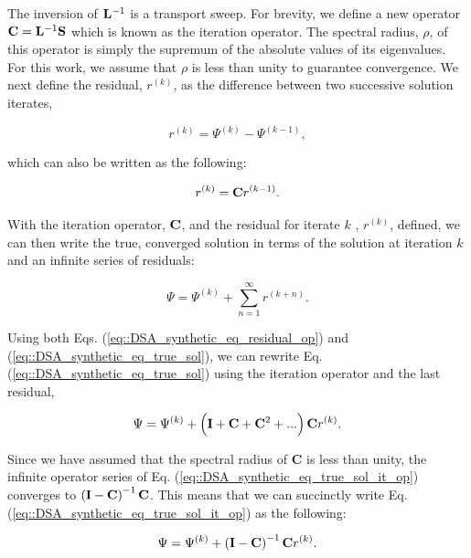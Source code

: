 \noindent The inversion of ${\bf L}^{-1}$ is a transport sweep. For brevity, we define a new operator ${\bf C} = {\bf L}^{-1} {\bf S}$ which is known as the iteration operator. The spectral radius, $\rho$, of this operator is simply the supremum of the absolute values of its eigenvalues. For this work, we assume that $\rho$ is less than unity to guarantee convergence. We next define the residual, $r^{(k)}$, as the difference between two successive solution iterates,

\begin{equation}
\label{eq::DSA_synthetic_eq_residual}
r^{(k)} = \Psi^{(k)} - \Psi^{(k-1)} ,
\end{equation}

\noindent which can also be written as the following:

\begin{equation}
\label{eq::DSA_synthetic_eq_residual_op}
r^{(k)} = {\bf C}r^{(k-1)} .
\end{equation}

With the iteration operator, ${\bf C}$, and the residual for iterate $k$ , $r^{(k)}$, defined, we can then write the true, converged solution in terms of the solution at iteration $k$ and an infinite series of residuals:

\begin{equation}
\label{eq::DSA_synthetic_eq_true_sol}
\Psi = \Psi^{(k)} + \sum_{n=1}^{\infty} r^{(k+n)} .
\end{equation}

\noindent Using both Eqs. (\ref{eq::DSA_synthetic_eq_residual_op}) and (\ref{eq::DSA_synthetic_eq_true_sol}), we can rewrite Eq. (\ref{eq::DSA_synthetic_eq_true_sol}) using the iteration operator and the last residual,

\begin{equation}
\label{eq::DSA_synthetic_eq_true_sol_it_op}
\Psi = \Psi^{(k)} + \left(  {\bf I} + {\bf C} + {\bf C}^2 + ...  \right) {\bf C} r^{(k)}.
\end{equation}

\noindent Since we have assumed that the spectral radius of {\bf C} is less than unity, the infinite operator series of Eq. (\ref{eq::DSA_synthetic_eq_true_sol_it_op}) converges to $\left(  {\bf I} - {\bf C}   \right)^{-1} {\bf C}$. This means that we can succinctly write Eq. (\ref{eq::DSA_synthetic_eq_true_sol_it_op}) as the following:

\begin{equation}
\label{eq::DSA_synthetic_eq_true_sol_it_op_succinct}
\Psi = \Psi^{(k)} + \left(  {\bf I} - {\bf C}   \right)^{-1} {\bf C} r^{(k)}.
\end{equation}

